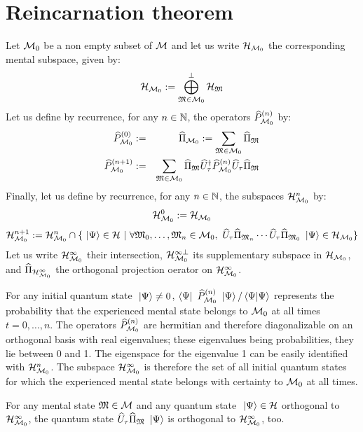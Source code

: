 \section{Reincarnation theorem}

 Let $\mathcal M_0$ be a non empty subset of $\mathcal M$ and let us write $\mathcal H_{\mathcal M_0}$ the corresponding mental subspace, given by:
\begin{equation*}
\mathcal H_{\mathcal M_0} := \bigoplus_{\mathfrak{M} \in \mathcal M_0}^\perp \mathcal H_{\mathfrak{M}}
\end{equation*}
Let us define by recurrence, for any $n \in \mathbb{N}$, the operators $\widehat{P}_{\mathcal M_0}^{(n)}$ by:
\begin{eqnarray*}
\widehat{P}_{\mathcal M_0}^{(0)} & := & \widehat{\Pi}_{\mathcal M_0} := \sum_{\mathfrak{M} \in \mathcal M_0} \widehat{\Pi}_{\mathfrak{M}} \\
\widehat{P}_{\mathcal M_0}^{(n+1)} & := & \sum_{\mathfrak{M} \in \mathcal M_0} \widehat{\Pi}_{\mathfrak{M}} \widehat{U}^{\dagger}_\tau \widehat{P}_{\mathcal M_0}^{(n)} \widehat{U}_\tau \widehat{\Pi}_{\mathfrak{M}}
\end{eqnarray*}
Finally, let us define by recurrence, for any $n \in \mathbb{N}$, the subspaces $\mathcal H_{\mathcal M_0}^n$ by:
\begin{equation*}
\mathcal H_{\mathcal M_0}^0 := \mathcal H_{\mathcal M_0}
\end{equation*}
\begin{equation*}
\mathcal H_{\mathcal M_0}^{n+1} := \mathcal H_{\mathcal M_0}^n \cap \{ \ \left|{\Psi}\right\rangle \in \mathcal H\ |\ \forall \mathfrak{M}_0, \dotsc, \mathfrak{M}_n \in \mathcal M_0,\ \widehat{U}_\tau \widehat{\Pi}_{\mathfrak{M}_n} \dotsm \widehat{U}_\tau \widehat{\Pi}_{\mathfrak{M}_0} \ \left|{\Psi}\right\rangle \in \mathcal H_{\mathcal M_0} \}
\end{equation*}
Let us write $\mathcal H_{\mathcal M_0}^\infty$ their intersection, $\mathcal H_{\mathcal M_0}^{\infty \perp}$ its supplementary subspace in $\mathcal H_{\mathcal M_0}$, and $\widehat{\Pi}_{\mathcal H_{\mathcal M_0}^\infty}$ the orthogonal projection oerator on $\mathcal H_{\mathcal M_0}^\infty$.

 For any initial quantum state $\ \left|{\Psi}\right\rangle \neq 0$, $\left\langle{\Psi}\right|\  \widehat{P}_{\mathcal M_0}^{(n)} \ \left|{\Psi}\right\rangle / \left\langle{\Psi}|{\Psi}\right\rangle$ represents the probability that the experienced mental state belongs to $\mathcal M_0$ at all times $t = 0, \dotsc, n$. The operators $\widehat{P}_{\mathcal M_0}^{(n)}$ are hermitian and therefore diagonalizable on an orthogonal basis with real eigenvalues; these eigenvalues being probabilities, they lie between 0 and 1. The eigenspace for the eigenvalue 1 can be easily identified with $\mathcal H_{\mathcal M_0}^n$. The subspace $\mathcal H_{\mathcal M_0}^\infty$ is therefore the set of all initial quantum states for which the experienced mental state belongs with certainty to $\mathcal M_0$ at all times.

 For any mental state $\mathfrak{M} \in \mathcal M$ and any quantum state $\ \left|{\Psi}\right\rangle \in \mathcal H$ orthogonal to $\mathcal H_{\mathcal M_0}^\infty$, the quantum state $\widehat{U}_\tau \widehat{\Pi}_{\mathfrak{M}} \ \left|{\Psi}\right\rangle$ is orthogonal to $\mathcal H_{\mathcal M_0}^\infty$, too.

